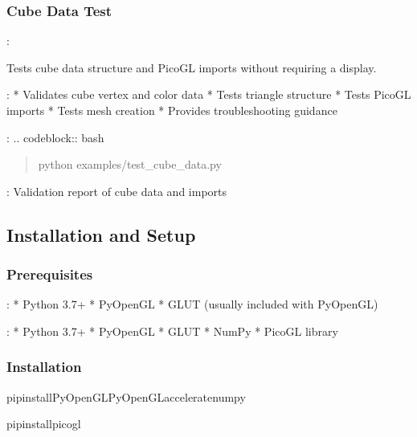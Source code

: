 \documentclass[a4paper,10pt,english,openany,oneside]{sphinxmanual}
\begin{document}
\subsubsection{Cube Data Test}
\label{\detokenize{legacy_examples:cube-data-test}}
\sphinxAtStartPar
{}: 

\sphinxAtStartPar
Tests cube data structure and PicoGL imports without requiring a display.

\sphinxAtStartPar
{}:
* Validates cube vertex and color data
* Tests triangle structure
* Tests PicoGL imports
* Tests mesh creation
* Provides troubleshooting guidance

\sphinxAtStartPar
{}:
.. code\sphinxhyphen{}block:: bash
\begin{quote}

\sphinxAtStartPar
python examples/test\_cube\_data.py
\end{quote}

\sphinxAtStartPar
{}: Validation report of cube data and imports


\subsection{Installation and Setup}
\label{\detokenize{legacy_examples:installation-and-setup}}

\subsubsection{Prerequisites}
\label{\detokenize{legacy_examples:prerequisites}}
\sphinxAtStartPar
{}:
* Python 3.7+
* PyOpenGL
* GLUT (usually included with PyOpenGL)

\sphinxAtStartPar
{}:
* Python 3.7+
* PyOpenGL
* GLUT
* NumPy
* PicoGL library


\subsubsection{Installation}
\label{\detokenize{legacy_examples:installation}}
\begin{sphinxVerbatim}[commandchars=\\\{\}]
pipinstallPyOpenGLPyOpenGL\PYGZus{}acceleratenumpy

pipinstallpicogl
\end{sphinxVerbatim}
\end{document}
